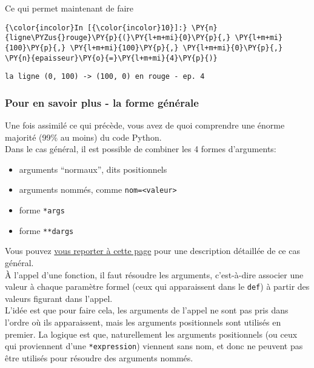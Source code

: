     Ce qui permet maintenant de faire

    \begin{Verbatim}[commandchars=\\\{\}]
{\color{incolor}In [{\color{incolor}10}]:} \PY{n}{ligne\PYZus{}rouge}\PY{p}{(}\PY{l+m+mi}{0}\PY{p}{,} \PY{l+m+mi}{100}\PY{p}{,} \PY{l+m+mi}{100}\PY{p}{,} \PY{l+m+mi}{0}\PY{p}{,} \PY{n}{epaisseur}\PY{o}{=}\PY{l+m+mi}{4}\PY{p}{)}
\end{Verbatim}


    \begin{Verbatim}[commandchars=\\\{\}]
la ligne (0, 100) -> (100, 0) en rouge - ep. 4

    \end{Verbatim}

    \hypertarget{pour-en-savoir-plus---la-forme-guxe9nuxe9rale}{%
\subsubsection{Pour en savoir plus - la forme
générale}\label{pour-en-savoir-plus---la-forme-guxe9nuxe9rale}}

    Une fois assimilé ce qui précède, vous avez de quoi comprendre une
énorme majorité (99\% au moins) du code Python.\\

Dans le cas général, il est possible de combiner les 4 formes
d'arguments:

\begin{itemize}
	\item 
	arguments ``normaux'', dits positionnels
	\item
	arguments nommés, comme \texttt{nom=\textless{}valeur\textgreater{}}
	\item
	forme \texttt{*args}
	\item
	forme \texttt{**dargs}
\end{itemize}

Vous pouvez
\href{https://docs.python.org/3/reference/expressions.html\#calls}{vous
reporter à cette page} pour une description détaillée de ce cas général.\\

    À l'appel d'une fonction, il faut résoudre les arguments, c'est-à-dire
associer une valeur à chaque paramètre formel (ceux qui apparaissent
dans le \texttt{def}) à partir des valeurs figurant dans l'appel.\\

L'idée est que pour faire cela, les arguments de l'appel ne sont pas
pris dans l'ordre où ils apparaissent, mais les arguments positionnels
sont utilisés en premier. La logique est que, naturellement les
arguments positionnels (ou ceux qui proviennent d'une
\texttt{*expression}) viennent sans nom, et donc ne peuvent pas être
utilisés pour résoudre des arguments nommés.\\


